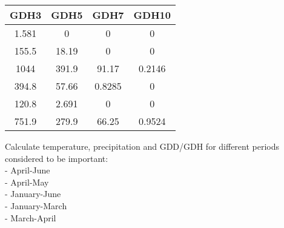 \documentclass[10pt,]{article}
\begin{document}
\begin{longtable}[]{@{}cccc@{}}
\toprule
GDH3 & GDH5 & GDH7 & GDH10\tabularnewline
\midrule
\endhead
1.581 & 0 & 0 & 0\tabularnewline
155.5 & 18.19 & 0 & 0\tabularnewline
1044 & 391.9 & 91.17 & 0.2146\tabularnewline
394.8 & 57.66 & 0.8285 & 0\tabularnewline
120.8 & 2.691 & 0 & 0\tabularnewline
751.9 & 279.9 & 66.25 & 0.9524\tabularnewline
\bottomrule
\end{longtable}

Calculate temperature, precipitation and GDD/GDH for different periods
considered to be important:\\
- April-June\\
- April-May\\
- January-June\\
- January-March\\
- March-April
\end{document}
